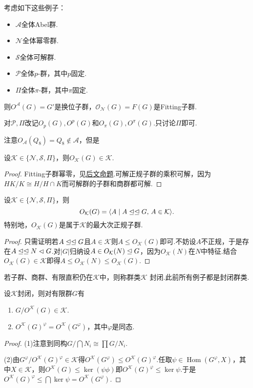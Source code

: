 考虑如下这些例子：
\begin{itemize}
	\item $\mathcal{A}$\quad 全体Abel群.
	\item $\mathcal{N}$\quad 全体幂零群.
	\item $\mathcal{S}$\quad 全体可解群.
	\item $\mathcal{P}$\quad 全体$p$-群，其中$p$固定.
	\item $\Pi$\quad 全体$\pi$-群，其中$\pi$固定.
\end{itemize}

则$O^{\mathcal{A}}(G)=G'$是换位子群，$\mathcal{O}_{\mathcal{N}}(G)=F(G)$是{\heiti Fitting子群}.

对$\mathcal{P},\Pi$改记$O_p(G),O^p(G)$和$O_\pi(G),O^\pi(G)$.只讨论$\Pi$即可.

注意$O_{\mathcal{A}}(Q_8)=Q_8\notin\mathcal{A}$，但是
\begin{lemma*}
	设$\mathcal{K}\in\{\mathcal{N},\mathcal{S},\Pi\}$，则$O_{\mathcal{K}}(G)\in\mathcal{K}$.
\end{lemma*}
\begin{proof}
	Fitting子群幂零，见\hyperlink{prop:FittingSubgrp}{后文命题}.可解正规子群的乘积可解，因为$HK/K\cong H/H\cap K$而可解群的子群和商群都可解.
\end{proof}
\begin{prop}
	设$\mathcal{K}\in\{\mathcal{N},\mathcal{S},\Pi\}$，则
	\[
		O_{\mathcal{K}}(G)=\langle A\mid A\trianglelefteq\trianglelefteq G,\,A\in\mathcal{K}\rangle.
	\]
	特别地，$O_{\mathcal{K}}(G)$是属于$\mathcal{K}$的最大次正规子群.
\end{prop}
\begin{proof}
	只需证明若$A\trianglelefteq\trianglelefteq G$且$A\in\mathcal{K}$则$A\le O_{\mathcal{K}}(G)$即可.不妨设$A$不正规，于是存在$A\trianglelefteq\trianglelefteq N\vartriangleleft G$.对$|G|$归纳设$A\in O_{\mathcal{K}}(N)\trianglelefteq G$，因为$O_{\mathcal{K}}(N)$在$N$中特征.结合$O_{\mathcal{K}}(G)\in\mathcal{K}$即得$A\le O_{\mathcal{K}}(N)\le O_{\mathcal{K}}(G)$.
\end{proof}

若子群、商群、有限直积仍在$\mathcal{K}$中，则称群类$\mathcal{K}$ {\heiti 封闭}.此前所有例子都是封闭群类.
\begin{prop}
	设$\mathcal{K}$封闭，则对有限群$G$有
	\begin{enumerate}
		\item $G/O^{\mathcal{K}}(G)\in\mathcal{K}$.
		\item $O^{\mathcal{K}}(G)^\varphi=O^{\mathcal{K}}(G^\varphi)$，其中$\varphi$是同态.
	\end{enumerate}
\end{prop}
\begin{proof}
	\hspace*{5.2pt}(1)注意到同构$G/\bigcap N_i\cong\prod G/N_i$.

	(2)由$G^\varphi/O^{\mathcal{K}}(G)^\varphi\in\mathcal{K}$得$O^{\mathcal{K}}(G^\varphi)\le O^{\mathcal{K}}(G)^\varphi$.任取$\psi\in\operatorname*{Hom}(G^\varphi,X)$，其中$X\in\mathcal{K}$，则$O^{\mathcal{K}}(G)\le\ker(\psi\phi)$即$O^{\mathcal{K}}(G)^\varphi\le\ker\psi$.于是$O^{\mathcal{K}}(G)^\varphi\le\bigcap\ker\psi=O^{\mathcal{K}}(G^\varphi)$.
\end{proof}

